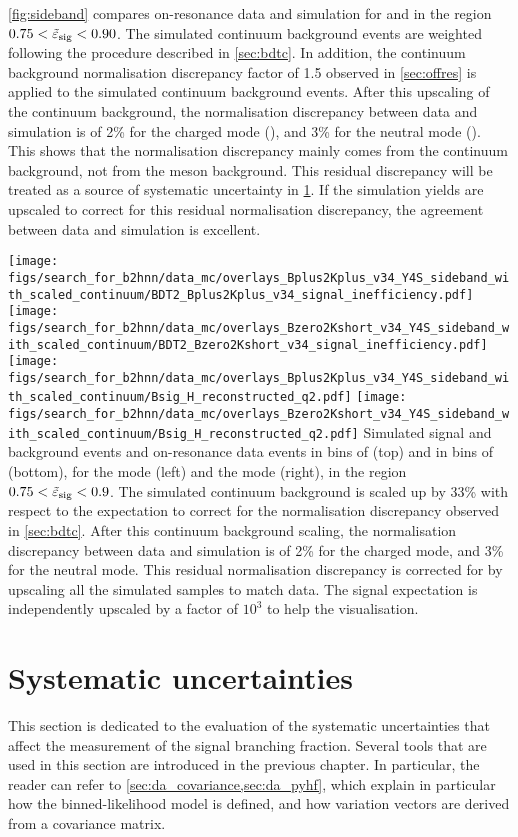 \cref{fig:sideband} compares on-resonance data and simulation for \qrec and \esig in the region $0.75<\tilde{\varepsilon}_{\mathrm{sig}}<0.90$.
The simulated continuum background events are weighted following the procedure described in \cref{sec:bdtc}.
In addition, the continuum background normalisation discrepancy factor of 1.5 observed in \cref{sec:offres} is applied to the simulated continuum background events.
After this upscaling of the continuum background, the normalisation discrepancy between data and simulation is of 2\% for the charged mode (\BKpnn), and 3\% for the neutral mode (\BKznn).
This shows that the normalisation discrepancy mainly comes from the continuum background, not from the \B meson background.
This residual discrepancy will be treated as a source of systematic uncertainty in \cref{sec:systematics}.
If the simulation yields are upscaled to correct for this residual normalisation discrepancy, the agreement between data and simulation is excellent.

{
\texttt{[image: figs/search\_for\_b2hnn/data\_mc/overlays\_Bplus2Kplus\_v34\_Y4S\_sideband\_with\_scaled\_continuum/BDT2\_Bplus2Kplus\_v34\_signal\_inefficiency.pdf]}
\texttt{[image: figs/search\_for\_b2hnn/data\_mc/overlays\_Bzero2Kshort\_v34\_Y4S\_sideband\_with\_scaled\_continuum/BDT2\_Bzero2Kshort\_v34\_signal\_inefficiency.pdf]}
\texttt{[image: figs/search\_for\_b2hnn/data\_mc/overlays\_Bplus2Kplus\_v34\_Y4S\_sideband\_with\_scaled\_continuum/Bsig\_H\_reconstructed\_q2.pdf]}
\texttt{[image: figs/search\_for\_b2hnn/data\_mc/overlays\_Bzero2Kshort\_v34\_Y4S\_sideband\_with\_scaled\_continuum/Bsig\_H\_reconstructed\_q2.pdf]}
}
{
Simulated signal and background events and on-resonance data events in bins of \esig (top) and in bins of \qrec (bottom), for the \BKpnn mode (left) and the \BKznn mode (right), in the region $0.75<\tilde{\varepsilon}_{\mathrm{sig}}<0.9$.
The simulated continuum background is scaled up by 33\% with respect to the expectation to correct for the normalisation discrepancy observed in \cref{sec:bdtc}.
After this continuum background scaling, the normalisation discrepancy between data and simulation is of 2\% for the charged mode, and 3\% for the neutral mode.
This residual normalisation discrepancy is corrected for by upscaling all the simulated samples to match data.
The signal expectation is independently upscaled by a factor of $10^3$ to help the visualisation.
}
\clearpage
\section{Systematic uncertainties} \label{sec:systematics}
This section is dedicated to the evaluation of the systematic uncertainties that affect the measurement of the signal branching fraction.
Several tools that are used in this section are introduced in the previous chapter.
In particular, the reader can refer to \cref{sec:da_covariance,sec:da_pyhf}, which explain in particular how the binned-likelihood model is defined, and how variation vectors are derived from a covariance matrix.

